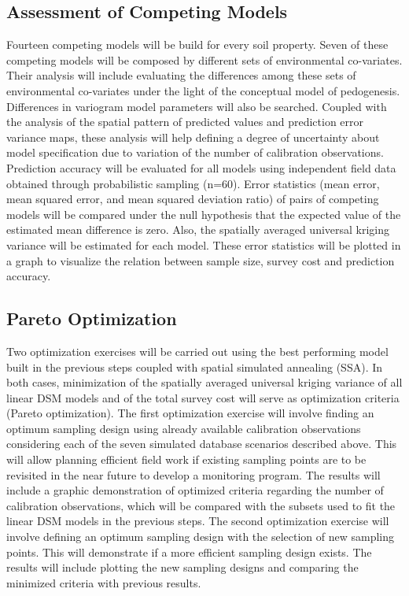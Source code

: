 \subsection{Assessment of Competing Models}

Fourteen competing models will be build for every soil property. Seven of these competing models will be composed by different sets of environmental co-variates. Their analysis will include evaluating the differences among these sets of environmental co-variates under the light of the conceptual model of pedogenesis. Differences in variogram model parameters will also be searched. Coupled with the analysis of the spatial pattern of predicted values and prediction error variance maps, these analysis will help defining a degree of uncertainty about model specification due to variation of the number of calibration observations. Prediction accuracy will be evaluated for all models using independent field data obtained through probabilistic sampling (n=60). Error statistics (mean error, mean squared error, and mean squared deviation ratio) of pairs of competing models will be compared under the null hypothesis that the expected value of the estimated mean difference is zero. Also, the spatially averaged universal kriging variance will be estimated for each model. These error statistics will be plotted in a graph to visualize the relation between sample size, survey cost and prediction accuracy.

\subsection{Pareto Optimization}

Two optimization exercises will be carried out using the best performing model built in the previous steps coupled with spatial simulated annealing (SSA). In both cases, minimization of the spatially averaged universal kriging variance of all linear DSM models and of the total survey cost will serve as optimization criteria (Pareto optimization). The first optimization exercise will involve finding an optimum sampling design using already available calibration observations considering each of the seven simulated database scenarios described above. This will allow planning efficient field work if existing sampling points are to be revisited in the near future to develop a monitoring program. The results will include a graphic demonstration of optimized criteria regarding the number of calibration observations, which will be compared with the subsets used to fit the linear DSM models in the previous steps. The second optimization exercise will involve defining an optimum sampling design with the selection of new sampling points. This will demonstrate if a more efficient sampling design exists. The results will include plotting the new sampling designs and comparing the minimized criteria with previous results.